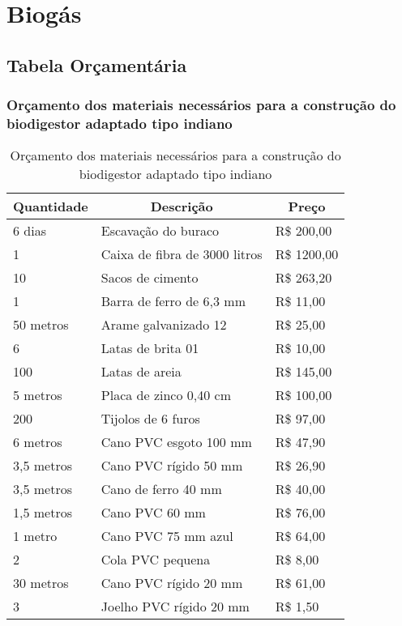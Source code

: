 \part{Biogás}
\chapter[Tabela Orçamentária]{Tabela Orçamentária}

\section {Orçamento dos materiais necessários para a construção do biodigestor adaptado tipo indiano}

\begin{table}[]
\centering
\caption{Orçamento dos materiais necessários para a construção do biodigestor adaptado tipo indiano}
\begin{tabular}{|l|l|l|}
\multicolumn{1}{c}{\textbf{Quantidade}} & \multicolumn{1}{c}{\textbf{Descrição}} & \multicolumn{1}{c}{\textbf{Preço}} \\ \hline
6 dias & Escavação do buraco & R\$ 200,00\\ \hline
1 & Caixa de fibra de 3000 litros & R\$ 1200,00 \\ \hline
10 & Sacos de cimento & R\$ 263,20 \\ \hline
1 & Barra de ferro de 6,3 mm & R\$ 11,00 \\ \hline
50 metros & Arame galvanizado 12 & R\$ 25,00 \\ \hline
6 & Latas de brita 01 & R\$ 10,00 \\ \hline
100 & Latas de areia & R\$ 145,00 \\ \hline
5 metros & Placa de zinco 0,40 cm & R\$ 100,00 \\ \hline
200 & Tijolos de 6 furos & R\$ 97,00 \\ \hline
6 metros & Cano PVC esgoto 100 mm & R\$ 47,90 \\ \hline
3,5 metros & Cano PVC rígido 50 mm & R\$ 26,90 \\ \hline
3,5 metros & Cano de ferro 40 mm & R\$ 40,00 \\ \hline
1,5 metros & Cano PVC 60 mm & R\$ 76,00 \\ \hline
1 metro & Cano PVC 75 mm azul & R\$ 64,00 \\ \hline
2 & Cola PVC pequena & R\$ 8,00 \\ \hline
30 metros & Cano PVC rígido 20 mm & R\$ 61,00 \\ \hline
3 & Joelho PVC rígido 20 mm & R\$ 1,50 \\ \hline

\end{tabular}
\end{table}
